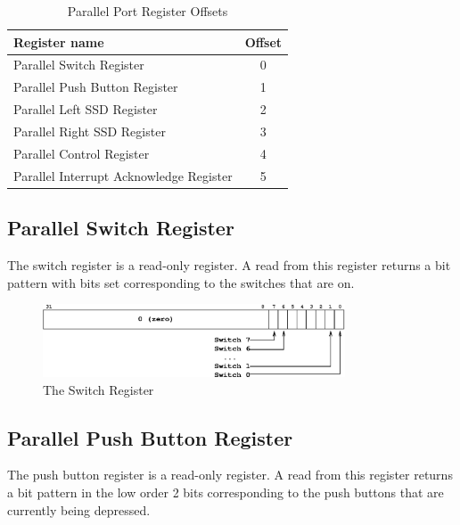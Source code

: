 \documentclass[a4paper,10pt]{article}
\begin{document}
\begin{table}[h]
\begin{center}
\begin{tabular}{|l|c|}
\hline
\textbf{Register name} & \textbf{Offset} \\
\hline
Parallel Switch Register & 0 \\
\hline
Parallel Push Button Register & 1 \\
\hline
Parallel Left SSD Register & 2 \\
\hline
Parallel Right SSD Register & 3 \\
\hline
Parallel Control Register & 4 \\
\hline
Parallel Interrupt Acknowledge Register & 5 \\
\hline
\end{tabular}
\caption{Parallel Port Register Offsets}
\label{table:parallel_offsets}
\end{center}
\end{table}



\subsection{Parallel Switch Register}

The switch register is a read-only register. A read from this register
returns a bit pattern with bits set corresponding to the switches that
are on.

\begin{figure}[h]
\begin{center}
\includegraphics[width=0.8\textwidth]{switch_reg.eps}
\caption{The Switch Register}
\label{switch_reg_pic}
\end{center}
\end{figure}


\subsection{Parallel Push Button Register}

The push button register is a read-only register. A read from this
register returns a bit pattern in the low order 2 bits corresponding
to the push buttons that are currently being depressed.
\end{document}
